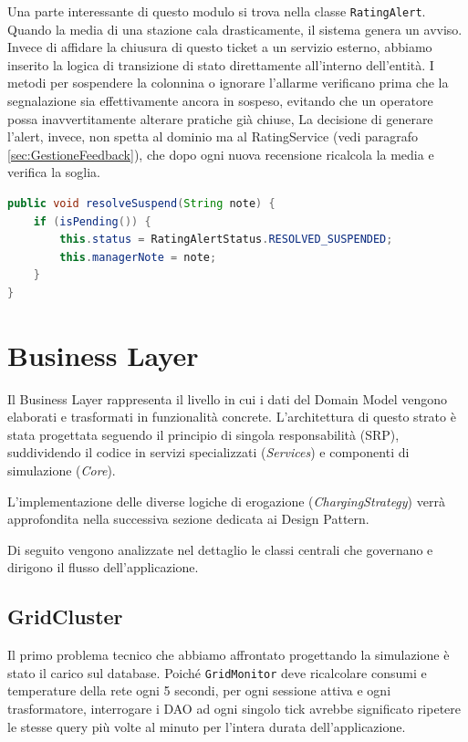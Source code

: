 Una parte interessante di questo modulo si trova nella classe \texttt{RatingAlert}. Quando la media di una stazione cala drasticamente, il sistema genera un avviso. Invece di affidare la chiusura di questo ticket a un servizio esterno, abbiamo inserito la logica di transizione di stato direttamente all'interno dell'entità. I metodi per sospendere la colonnina o ignorare l'allarme verificano prima che la segnalazione sia effettivamente ancora in sospeso, evitando che un operatore possa inavvertitamente alterare pratiche già chiuse, La decisione di generare l'alert, invece, non spetta al dominio ma al RatingService (vedi paragrafo \ref{sec:GestioneFeedback}), che dopo ogni nuova recensione ricalcola la media e verifica la soglia.

\vspace{0.3cm}
\noindent\begin{minipage}{\linewidth}
\begin{lstlisting}[language=Java, caption={Chiusura di un alert di manutenzione}]
public void resolveSuspend(String note) {
    if (isPending()) {
        this.status = RatingAlertStatus.RESOLVED_SUSPENDED;
        this.managerNote = note;
    }
}
\end{lstlisting}
\end{minipage}

\section{Business Layer}
\label{sec: Business}
Il Business Layer rappresenta il livello in cui i dati del Domain Model vengono elaborati e trasformati in funzionalità concrete. L'architettura di questo strato è stata progettata seguendo il principio di singola responsabilità (SRP), suddividendo il codice in servizi specializzati (\textit{Services}) e componenti di simulazione (\textit{Core}).

L'implementazione delle diverse logiche di erogazione (\textit{ChargingStrategy}) verrà approfondita nella successiva sezione dedicata ai Design Pattern.

Di seguito vengono analizzate nel dettaglio le classi centrali che governano e dirigono il flusso dell'applicazione.

\subsection{GridCluster}
\label{subsec:gridcluster}
Il primo problema tecnico che abbiamo affrontato progettando la simulazione è stato il carico sul database. Poiché \texttt{GridMonitor} deve ricalcolare consumi e temperature della rete ogni 5 secondi, per ogni sessione attiva e ogni trasformatore, interrogare i DAO ad ogni singolo tick avrebbe significato ripetere le stesse query più volte al minuto per l'intera durata dell'applicazione.

